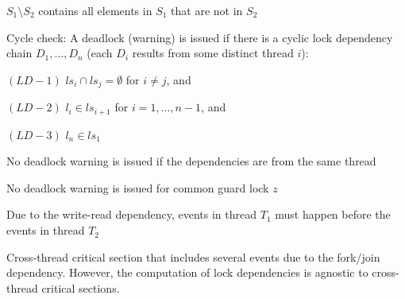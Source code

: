 \documentclass[landscape, a4paper]{article}
\begin{document}
\begin{minipage}[t]{0.2\linewidth}
\begin{betterlist}
\begin{betterlist}
			\adjustbox{scale=0.5}{
            \begin{dnumberedcodebox}[minted language=text,minted options={autogobble, fontsize=\small}, box align=top]
            acq(t,y) {
                Ds = Ds U { (t,y,ls(t)) } if ls(t) != emptyset
                ls(t) = ls(t) U {y}
            }
            rel(t,y) {
                ls(t) = ls(t) \ {y}
            }
            fork(t1,t2) {
            }
            ...
            \end{dnumberedcodebox}
			}
			\begin{betterlist}
				\item {} $S_1 \setminus S_2$ contains all elements in $S_1$ that are not in $S_2$
			\end{betterlist}
			\item \alert{Cycle check}: A deadlock (warning) is issued if there is a cyclic lock dependency chain $D_1, \ldots, D_n$ (each $D_i$ results from some distinct thread $i$):
			\begin{betterlist}
				\item $(LD-1)$ $ls_i \cap ls_j = \emptyset$ for $i \ne j$, and
				\item $(LD-2)$ $l_i \in ls_{i + 1}$ for $i = 1, \ldots, 𝑛 − 1$, and
				\item $(LD-3)$ $l_𝑛 \in ls_1$
			\end{betterlist}
			\begin{betterlist}
				\item No deadlock warning is issued if the dependencies are from the same thread
				\item No deadlock warning is issued for common guard lock $z$
			\end{betterlist}
			\item \nul{Precision:}
			\begin{betterlist}
				\item {} Due to the \alert{write-read dependency}, events in thread $T_1$ must happen before the events in thread $T_2$
				\item {} \alert{Cross-thread critical} section that includes several events due to the \alert{fork/join dependency}. However, the computation of lock dependencies is \alert{agnostic} to \alert{cross-thread critical sections}. \script{161}{Example}
			\end{betterlist}


\end{betterlist}
\end{betterlist}
\end{minipage}
\end{document}
